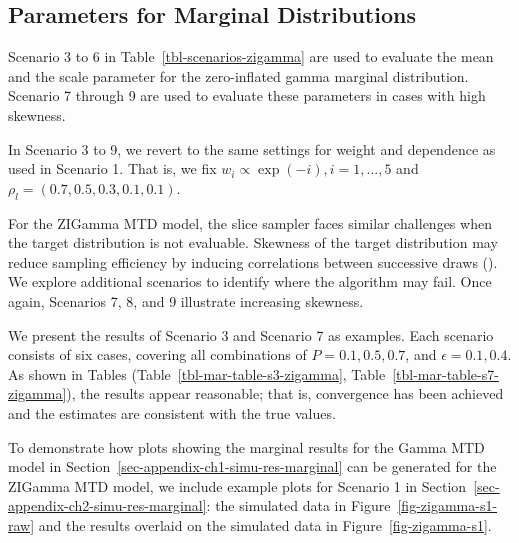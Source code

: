 \documentclass[
  letterpaper,
  double,
  12pt,
  1.0in]{beavtex}
\begin{document}
\subsection{Parameters for Marginal
Distributions}\label{sec-ch2-simu-res-marginal}

Scenario 3 to 6 in Table~\ref{tbl-scenarios-zigamma} are used to
evaluate the mean and the scale parameter for the zero-inflated gamma
marginal distribution. Scenario 7 through 9 are used to evaluate these
parameters in cases with high skewness.

In Scenario 3 to 9, we revert to the same settings for weight and
dependence as used in Scenario 1. That is, we fix
\(w_i \propto \exp(-i), i = 1,..., 5\) and
\(\rho_l = (0.7, 0.5, 0.3, 0.1, 0.1)\).

For the ZIGamma MTD model, the slice sampler faces similar challenges
when the target distribution is not evaluable. Skewness of the target
distribution may reduce sampling efficiency by inducing correlations
between successive draws (). We explore additional scenarios to identify where the
algorithm may fail. Once again, Scenarios 7, 8, and 9 illustrate
increasing skewness.

We present the results of Scenario 3 and Scenario 7 as examples. Each
scenario consists of six cases, covering all combinations of
\(P = 0.1, 0.5, 0.7\), and \(\epsilon = 0.1, 0.4\). As shown in Tables
(Table~\ref{tbl-mar-table-s3-zigamma},
Table~\ref{tbl-mar-table-s7-zigamma}), the results appear reasonable;
that is, convergence has been achieved and the estimates are consistent
with the true values.

To demonstrate how plots showing the marginal results for the Gamma MTD
model in Section~\ref{sec-appendix-ch1-simu-res-marginal} can be
generated for the ZIGamma MTD model, we include example plots for
Scenario 1 in Section~\ref{sec-appendix-ch2-simu-res-marginal}: the
simulated data in Figure~\ref{fig-zigamma-s1-raw} and the results
overlaid on the simulated data in Figure~\ref{fig-zigamma-s1}.
\end{document}
